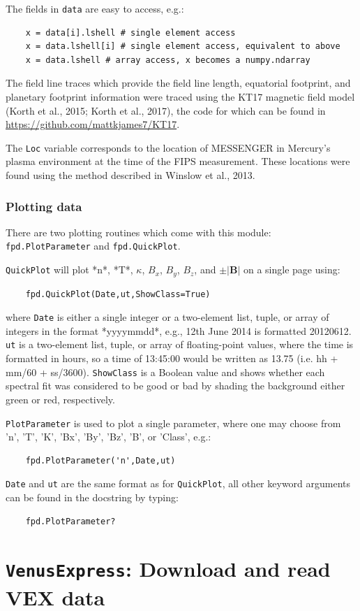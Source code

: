 	The fields in \texttt{data} are easy to access, e.g.:
	\begin{verbatim}
	x = data[i].lshell # single element access
	x = data.lshell[i] # single element access, equivalent to above
	x = data.lshell # array access, x becomes a numpy.ndarray
	\end{verbatim}
	
	The field line traces which provide the field line length, equatorial
	footprint, and planetary footprint information were traced using the KT17
	magnetic field model (Korth et al., 2015; Korth et al., 2017), the code
	for which can be found in \url{https://github.com/mattkjames7/KT17}.
	
	The \texttt{Loc} variable corresponds to the location of MESSENGER in Mercury's
	plasma environment at the time of the FIPS measurement. These locations 
	were found using the method described in Winslow et al., 2013.
	
	\subsubsection{Plotting data}
	There are two plotting routines which come with this module: 
	\texttt{fpd.PlotParameter} and \texttt{fpd.QuickPlot}.
	
	\texttt{QuickPlot} will plot *n*, *T*, \(\kappa\), \(B_x\), \(B_y\),
	\(B_z\), and \(\pm|\mathbf{B}|\) on a single page using:
	\begin{verbatim}
	fpd.QuickPlot(Date,ut,ShowClass=True)
	\end{verbatim}
	where \texttt{Date} is either a single integer or a two-element list, tuple, or
	array of integers in the format *yyyymmdd*, e.g., 12th June 2014 is formatted
	20120612. \texttt{ut} is a two-element list, tuple, or array
	of floating-point values, where the time is formatted in hours, so a
	time of 13:45:00 would be written as 13.75 (i.e. hh + mm/60 + ss/3600).
	\texttt{ShowClass} is a Boolean value and shows whether each spectral fit was
	considered to be good or bad by shading the background either green or red,
	respectively.
	
	\texttt{PlotParameter} is used to plot a single parameter, where one may choose
	from 'n', 'T', 'K', 'Bx', 'By', 'Bz', 'B', or 'Class', e.g.:
	\begin{verbatim}
	fpd.PlotParameter('n',Date,ut)
	\end{verbatim}
	
	\texttt{Date} and \texttt{ut} are the same format as for \texttt{QuickPlot}, all other 
	keyword arguments can be found in the docstring by typing:
	\begin{verbatim}
	fpd.PlotParameter?
	\end{verbatim}
	

	\section{\texttt{VenusExpress}: Download and read VEX data}